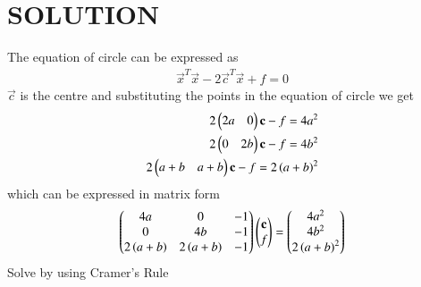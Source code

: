 \documentclass[journal,12pt,twocolumn]{IEEEtran}
\begin{document}
\section{SOLUTION}
The equation of circle can be expressed as
\begin{align}
    \vec{x}^T\vec{x}-2\vec{c}^T\vec{x}+f = 0
\end{align}
$\vec{c}$ is the centre  and substituting the points in the equation of circle we get
\begin{align}
2\begin{pmatrix}2a&0\end{pmatrix}\mathbf{c}-f=4a^2\\
2\begin{pmatrix}0&2b\end{pmatrix}\mathbf{c}-f=4b^2\\
2\begin{pmatrix}a+b&a+b\end{pmatrix}\mathbf{c}-f=2\left(a+b\right)^2
\end{align}
which can be expressed in matrix form
\begin{align}
\begin{pmatrix}4a&0&-1\\0&4b&-1\\2\left(a+b\right)&2\left(a+b\right)&-1\end{pmatrix}\begin{pmatrix}\mathbf{c}\\f\end{pmatrix} = \begin{pmatrix}4a^2\\4b^2\\2\left(a+b\right)^2\end{pmatrix}
\end{align}
Solve by using Cramer's Rule
\end{document}
